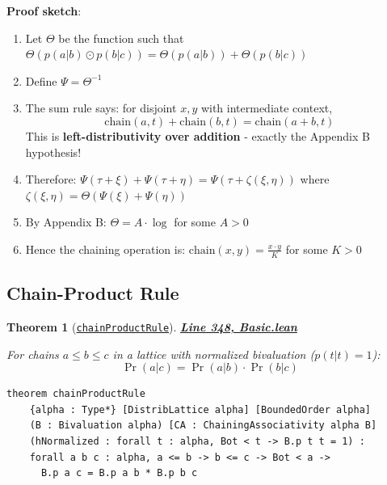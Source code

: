 \documentclass[11pt]{article}
\newtheorem{theorem}{Theorem}[section]
\theoremstyle{definition}
\theoremstyle{remark}
\begin{document}
\textbf{Proof sketch}:
\begin{enumerate}
\item Let $\Theta$ be the function such that $\Theta(p(a|b) \odot p(b|c)) = \Theta(p(a|b)) + \Theta(p(b|c))$
\item Define $\Psi = \Theta^{-1}$
\item The sum rule says: for disjoint $x, y$ with intermediate context,
\[ \text{chain}(a, t) + \text{chain}(b, t) = \text{chain}(a+b, t) \]
This is \textbf{left-distributivity over addition} - exactly the Appendix B hypothesis!
\item Therefore: $\Psi(\tau + \xi) + \Psi(\tau + \eta) = \Psi(\tau + \zeta(\xi, \eta))$ where $\zeta(\xi,\eta) = \Theta(\Psi(\xi) + \Psi(\eta))$
\item By Appendix B: $\Theta = A \cdot \log$ for some $A > 0$
\item Hence the chaining operation is: $\text{chain}(x, y) = \frac{x \cdot y}{K}$ for some $K > 0$
\end{enumerate}

\subsection{Chain-Product Rule}

\begin{theorem}[\href{https://github.com/zariuq/ks-foundations-of-inference/blob/main/KnuthSkilling/Probability/ConditionalProbability/Basic.lean\#L348}{\texttt{chainProductRule}}]
\textbf{\href{https://github.com/zariuq/ks-foundations-of-inference/blob/main/KnuthSkilling/Probability/ConditionalProbability/Basic.lean\#L348}{Line 348, Basic.lean}}

For chains $a \leq b \leq c$ in a lattice with normalized bivaluation ($p(t|t) = 1$):
\[ \Pr(a|c) = \Pr(a|b) \cdot \Pr(b|c) \]
\end{theorem}

\begin{lstlisting}[caption={\texttt{chainProductRule} (\href{https://github.com/zariuq/ks-foundations-of-inference/blob/main/KnuthSkilling/Probability/ConditionalProbability/Basic.lean\#L348}{Basic.lean:348})},numbers=none]
theorem chainProductRule
    {alpha : Type*} [DistribLattice alpha] [BoundedOrder alpha]
    (B : Bivaluation alpha) [CA : ChainingAssociativity alpha B]
    (hNormalized : forall t : alpha, Bot < t -> B.p t t = 1) :
    forall a b c : alpha, a <= b -> b <= c -> Bot < a ->
      B.p a c = B.p a b * B.p b c
\end{lstlisting}
\end{document}
